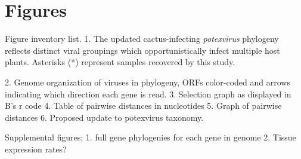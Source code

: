 \documentclass[11pt,letterpaper,titlepage]{article}
\begin{document}
\pagebreak
\frenchspacing
{}
\setlength{\parindent}{0.0in}

\section*{Figures}
Figure inventory list.
1. The updated cactus-infecting \textit{potexvirus} phylogeny reflects distinct viral groupings which opportunistically infect multiple host plants. Asterisks (*) represent samples recovered by this study. 

2. Genome organization of viruses in phylogeny, ORFs color-coded and arrows indicating which direction each gene is read.
3. Selection graph as displayed in B's r code
4. Table of pairwise distances in nucleotides
5. Graph of pairwise distances
6. Proposed update to potexvirus taxonomy.

Supplemental figures:
1. full gene phylogenies for each gene in genome
2. Tissue expression rates?




\end{document}
